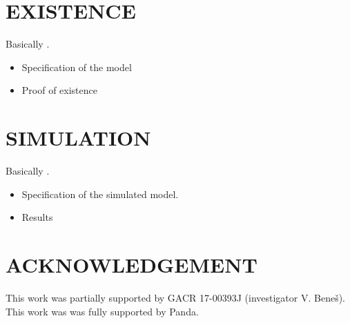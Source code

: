 \documentclass{kybernetika}
\begin{document}
\section{EXISTENCE}
Basically \cite{DDG12}.

\begin{itemize}
\item Specification of the model
\item Proof of existence
\end{itemize}

\section{SIMULATION}
Basically \cite{DL11}.

\begin{itemize}
\item Specification of the simulated model.
\item Results
\end{itemize}

\section*{ACKNOWLEDGEMENT}
\small
This work was partially supported by GACR 17-00393J (investigator V. Bene\v{s}). This work was was fully supported by Panda.

\makesubmdate
\end{document}
